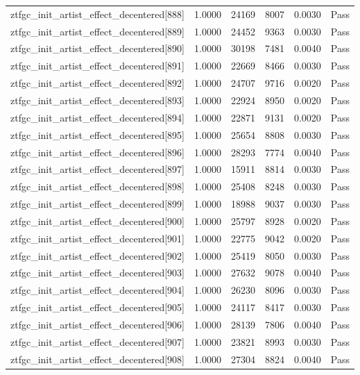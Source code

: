 \begin{table}[htbp]
\begin{tabular}{llrrll}
ztfgc\_init\_artist\_effect\_decentered[888] & 1.0000 & 24169 & 8007 & 0.0030 & Pass \\
ztfgc\_init\_artist\_effect\_decentered[889] & 1.0000 & 24452 & 9363 & 0.0030 & Pass \\
ztfgc\_init\_artist\_effect\_decentered[890] & 1.0000 & 30198 & 7481 & 0.0040 & Pass \\
ztfgc\_init\_artist\_effect\_decentered[891] & 1.0000 & 22669 & 8466 & 0.0030 & Pass \\
ztfgc\_init\_artist\_effect\_decentered[892] & 1.0000 & 24707 & 9716 & 0.0020 & Pass \\
ztfgc\_init\_artist\_effect\_decentered[893] & 1.0000 & 22924 & 8950 & 0.0020 & Pass \\
ztfgc\_init\_artist\_effect\_decentered[894] & 1.0000 & 22871 & 9131 & 0.0020 & Pass \\
ztfgc\_init\_artist\_effect\_decentered[895] & 1.0000 & 25654 & 8808 & 0.0030 & Pass \\
ztfgc\_init\_artist\_effect\_decentered[896] & 1.0000 & 28293 & 7774 & 0.0040 & Pass \\
ztfgc\_init\_artist\_effect\_decentered[897] & 1.0000 & 15911 & 8814 & 0.0030 & Pass \\
ztfgc\_init\_artist\_effect\_decentered[898] & 1.0000 & 25408 & 8248 & 0.0030 & Pass \\
ztfgc\_init\_artist\_effect\_decentered[899] & 1.0000 & 18988 & 9037 & 0.0030 & Pass \\
ztfgc\_init\_artist\_effect\_decentered[900] & 1.0000 & 25797 & 8928 & 0.0020 & Pass \\
ztfgc\_init\_artist\_effect\_decentered[901] & 1.0000 & 22775 & 9042 & 0.0020 & Pass \\
ztfgc\_init\_artist\_effect\_decentered[902] & 1.0000 & 25419 & 8050 & 0.0030 & Pass \\
ztfgc\_init\_artist\_effect\_decentered[903] & 1.0000 & 27632 & 9078 & 0.0040 & Pass \\
ztfgc\_init\_artist\_effect\_decentered[904] & 1.0000 & 26230 & 8096 & 0.0030 & Pass \\
ztfgc\_init\_artist\_effect\_decentered[905] & 1.0000 & 24117 & 8417 & 0.0030 & Pass \\
ztfgc\_init\_artist\_effect\_decentered[906] & 1.0000 & 28139 & 7806 & 0.0040 & Pass \\
ztfgc\_init\_artist\_effect\_decentered[907] & 1.0000 & 23821 & 8993 & 0.0030 & Pass \\
ztfgc\_init\_artist\_effect\_decentered[908] & 1.0000 & 27304 & 8824 & 0.0040 & Pass \\

\end{tabular}
\end{table}
